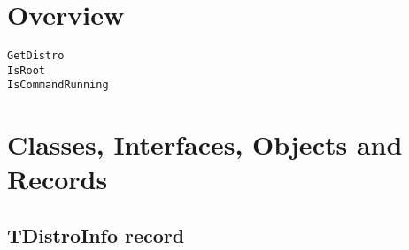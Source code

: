 \documentclass{report}
\newif\ifpdf
\begin{document}
\section{Overview}
\begin{description}
\item[\texttt{\begin{ttfamily}TDistroInfo\end{ttfamily} record}]
\end{description}
\begin{description}
\item[\texttt{GetDistro}]
\item[\texttt{IsRoot}]
\item[\texttt{IsCommandRunning}]
\end{description}
\section{Classes, Interfaces, Objects and Records}
\ifpdf
\subsection*{\large{\textbf{TDistroInfo record}}\normalsize\hspace{1ex}\hrulefill}
\else
\subsection*{TDistroInfo record}
\fi
\label{distri.TDistroInfo}
\end{document}

